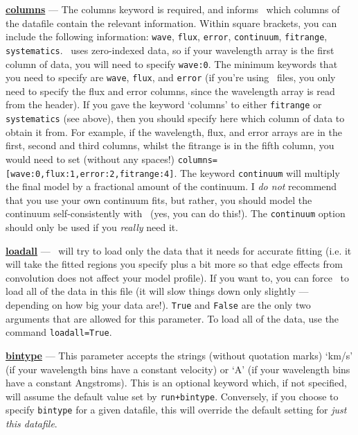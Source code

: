 \textbf{\underline{columns}} --- The columns keyword is required, and informs \alis\ which
     columns of the datafile contain the relevant information. Within square brackets, you can
     include the following information:
     \texttt{wave}, \texttt{flux}, \texttt{error}, \texttt{continuum}, \texttt{fitrange}, \texttt{systematics}.
     \alis\ uses zero-indexed data, so if your wavelength array is the first column of data, you
     will need to specify \texttt{wave:0}. The minimum keywords that you need to specify are
     \texttt{wave}, \texttt{flux}, and \texttt{error} (if you're using \fits\ files, you only need to specify
     the flux and error columns, since the wavelength array is read from the header). If you
     gave the keyword `columns' to either \texttt{fitrange} or \texttt{systematics} (see above),
     then you should specify here which column of data to obtain it from. For example, if the
     wavelength, flux, and error arrays are in the first, second and third columns, whilst the
     fitrange is in the fifth column, you would need to set (without any spaces!) \texttt{columns=[wave:0,flux:1,error:2,fitrange:4]}.
     The keyword \texttt{continuum} will multiply the final model by a fractional amount of the
     continuum. I \textit{do not} recommend that you use your own continuum fits, but rather,
     you should model the continuum self-consistently with \alis\ (yes, you can do this!). The
     \texttt{continuum} option should only be used if you \textit{really} need it.

\textbf{\underline{loadall}} --- \alis\ will try to load only the data that it needs for accurate fitting
     (i.e. it will take the fitted regions you specify plus a bit more so that edge effects from
     convolution does not affect your model profile). If you want to, you can force \alis\ to
     load all of the data in this file (it will slow things down only slightly --- depending on how big
     your data are!). \texttt{True} and \texttt{False} are the only two arguments that are allowed for
     this parameter. To load all of the data, use the command \texttt{loadall=True}.

\textbf{\underline{bintype}} --- This parameter accepts the strings (without quotation marks)
     `km/s' (if your wavelength bins have a constant velocity) or
     `A' (if your wavelength bins have a constant Angstroms).
     This is an optional keyword which, if not specified, will assume the default
     value set by \texttt{run+bintype}. Conversely, if you choose to specify \texttt{bintype}
     for a given datafile, this will override the default setting for \textit{just this datafile}.

